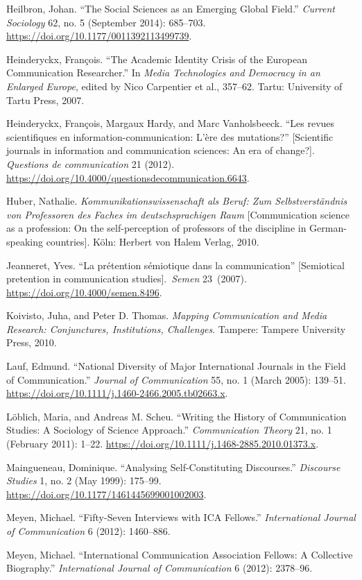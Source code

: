 \documentclass{tufte-handout}
\begin{document}
\begin{hangparas}{.25in}{1}
Heilbron, Johan. ``The Social Sciences as an Emerging Global Field.''
\emph{Current Sociology} 62, no. 5 (September 2014): 685--703.
\url{https://doi.org/10.1177/0011392113499739}.

Heinderyckx, François. ``The Academic Identity Crisis of the European
Communication Researcher.'' In \emph{Media Technologies and Democracy in
an Enlarged Europe}, edited by Nico Carpentier et al., 357--62. Tartu:
University of Tartu Press, 2007.

Heinderyckx, François, Margaux Hardy, and Marc Vanholsbeeck. ``Les
revues scientifiques en information-communication: L'ère des
mutations?'' {[}Scientific journals in information and communication
sciences: An era of change?{]}. \emph{Questions de communication} 21
(2012). \url{https://doi.org/10.4000/questionsdecommunication.6643}.

Huber, Nathalie. \emph{Kommunikationswissenschaft als Beruf: Zum
Selbstverständnis von Professoren des Faches im deutschsprachigen Raum}
{[}Communication science as a profession: On the self-perception of
professors of the discipline in German-speaking countries{]}. Köln:
Herbert von Halem Verlag, 2010.

Jeanneret, Yves. ``La prétention sémiotique dans la communication''
{[}Semiotical pretention in communication studies{]}.~\emph{Semen}
23~(2007). \url{https://doi.org/10.4000/semen.8496}.

Koivisto, Juha, and Peter D. Thomas. \emph{Mapping Communication and
Media Research: Conjunctures, Institutions, Challenges}. Tampere:
Tampere University Press, 2010.

Lauf, Edmund. ``National Diversity of Major International Journals in
the Field of Communication.'' \emph{Journal of Communication} 55, no. 1
(March 2005): 139--51.
\url{https://doi.org/10.1111/j.1460-2466.2005.tb02663.x}.

Löblich, Maria, and Andreas M. Scheu. ``Writing the History of
Communication Studies: A Sociology of Science Approach.''
\emph{Communication Theory} 21, no. 1 (February 2011): 1--22.
\url{https://doi.org/10.1111/j.1468-2885.2010.01373.x}.

Maingueneau, Dominique. ``Analysing Self-Constituting Discourses.''
\emph{Discourse Studies} 1, no. 2 (May 1999): 175--99.
\url{https://doi.org/10.1177/1461445699001002003}.

Meyen, Michael. ``Fifty-Seven Interviews with ICA Fellows.''
\emph{International Journal of Communication} 6 (2012): 1460--886.

Meyen, Michael. ``International Communication Association Fellows: A
Collective Biography.'' \emph{International Journal of Communication} 6
(2012): 2378--96.


\end{hangparas}
\end{document}
